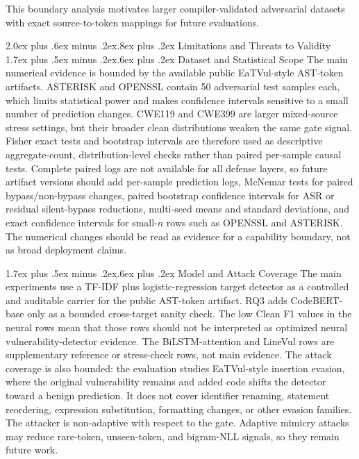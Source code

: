 \documentclass[letterpaper,twocolumn,10pt,twoside]{article}
\makeatletter
\renewcommand\section{\@startsection{section}{1}{\z@}%
  {2.0ex plus .6ex minus .2ex}{.8ex plus .2ex}%
  {\normalfont\large\bfseries}}
\renewcommand\subsection{\@startsection{subsection}{2}{\z@}%
  {1.7ex plus .5ex minus .2ex}{.6ex plus .2ex}%
  {\normalfont\normalsize\bfseries}}
\newcommand{\asrshort}{ASR}
\newcommand{\dataset}[1]{\textsc{#1}}
\makeatother
\begin{document}
This boundary analysis motivates larger compiler-validated adversarial datasets with exact source-to-token mappings for future evaluations.

\section{Limitations and Threats to Validity}
\subsection{Dataset and Statistical Scope}
The main numerical evidence is bounded by the available public EaTVul-style AST-token artifacts. \dataset{ASTERISK} and \dataset{OPENSSL} contain 50 adversarial test samples each, which limits statistical power and makes confidence intervals sensitive to a small number of prediction changes. \dataset{CWE119} and \dataset{CWE399} are larger mixed-source stress settings, but their broader clean distributions weaken the same gate signal. Fisher exact tests and bootstrap intervals are therefore used as descriptive aggregate-count, distribution-level checks rather than paired per-sample causal tests. Complete paired logs are not available for all defense layers, so future artifact versions should add per-sample prediction logs, McNemar tests for paired bypass/non-bypass changes, paired bootstrap confidence intervals for \asrshort{} or residual silent-bypass reductions, multi-seed means and standard deviations, and exact confidence intervals for small-$n$ rows such as \dataset{OPENSSL} and \dataset{ASTERISK}. The numerical changes should be read as evidence for a capability boundary, not as broad deployment claims.

\subsection{Model and Attack Coverage}
The main experiments use a TF-IDF plus logistic-regression target detector as a controlled and auditable carrier for the public AST-token artifact. RQ3 adds CodeBERT-base only as a bounded cross-target sanity check. The low Clean F1 values in the neural rows mean that those rows should not be interpreted as optimized neural vulnerability-detector evidence. The BiLSTM-attention and LineVul rows are supplementary reference or stress-check rows, not main evidence. The attack coverage is also bounded: the evaluation studies EaTVul-style insertion evasion, where the original vulnerability remains and added code shifts the detector toward a benign prediction. It does not cover identifier renaming, statement reordering, expression substitution, formatting changes, or other evasion families. The attacker is non-adaptive with respect to the gate. Adaptive mimicry attacks may reduce rare-token, unseen-token, and bigram-NLL signals, so they remain future work.
\end{document}

